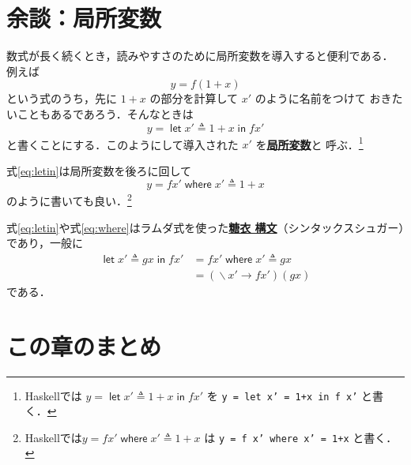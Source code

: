 \documentclass[a5paper,twoside,fleqn,draft]{jsbook}
\newcommand{\programminglanguage}[1]{\textsf{#1}}
\newcommand{\haskell}{\programminglanguage{Haskell}}
\newcommand{\keyword}[1]{{\underline{\textbf{#1}}}}
\newcommand{\code}[1]{\texttt{#1}}
\newcommand{\mKeyword}[1]{\mathsf{#1}}
\newcommand{\mIfKeyword}{\mKeyword{if}}
\newcommand{\mInKeyword}{\mKeyword{in}}
\newcommand{\mLetKeyword}{\mKeyword{let}}
\newcommand{\mOtherwiseKeyword}{\mKeyword{otherwise}}
\newcommand{\mWhereKeyword}{\mKeyword{where}}
\DeclareMathOperator{\mIf}{\mIfKeyword}
\DeclareMathOperator{\mLet}{\mLetKeyword}
\DeclareMathOperator{\mLetIn}{\mInKeyword}
\DeclareMathOperator{\mOtherwise}{\mOtherwiseKeyword}
\DeclareMathOperator{\mWhere}{\mWhereKeyword}
\DeclareMathOperator{\mLambda}{\backslash}
\DeclareMathOperator{\mLambdaArrow}{\rightarrow}
\DeclareMathOperator{\mLetEq}{\triangleq}
\DeclareMathOperator{\mWhereEq}{\mLetEq}
\begin{document}

\section{余談：局所変数}

数式が長く続くとき，読みやすさのために局所変数を導入すると便利である．
例えば
\begin{equation}
  y
  =f(1+x)
\end{equation}
という式のうち，先に $1+x$ の部分を計算して $x'$ のように名前をつけて
おきたいこともあるであろう．そんなときは
\begin{equation}
  \label{eq:letin}
  y
  =\mLet x'
  \mLetEq 1+x
  \mLetIn fx'
\end{equation}
と書くことにする．このようにして導入された $x'$ を\keyword{局所変数}と
呼ぶ．\footnote{\haskell では $y=\mLet x'\mLetEq1+x\mLetIn fx'$ を
  \code{y = let x' = 1+x in f x'} と書く．}

式\eqref{eq:letin}は局所変数を後ろに回して
\begin{equation}
  \label{eq:where}
  y=fx'\mWhere x'\mWhereEq 1+x
\end{equation}
のように書いても良い．\footnote{\haskell では$y=fx'\mWhere
  x'\mWhereEq1+x$ は \code{y = f x' where x' = 1+x} と書く．}

式\eqref{eq:letin}や式\eqref{eq:where}はラムダ式を使った\keyword{糖衣
  構文}（シンタックスシュガー）であり，一般に
\begin{align}
  \mLet x'\mLetEq gx\mLetIn fx'
  &=fx'\mWhere x'\mWhereEq gx\\
  &=(\mLambda x'\mLambdaArrow fx')(gx)
\end{align}
である．

\section{この章のまとめ}
\end{document}
